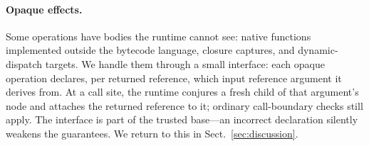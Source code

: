 \paragraph{Opaque effects.}
Some operations have bodies the runtime cannot see: native functions
implemented outside the bytecode language, closure captures, and
dynamic-dispatch targets. We handle them through a small interface:
each opaque operation declares, per returned reference, which input
reference argument it derives from. At a call site, the runtime
conjures a fresh child of that argument's node and attaches the
returned reference to it; ordinary call-boundary checks still apply.
The interface is part of the trusted base---an incorrect declaration
silently weakens the guarantees. We return to this in
Sect.~\ref{sec:discussion}.
